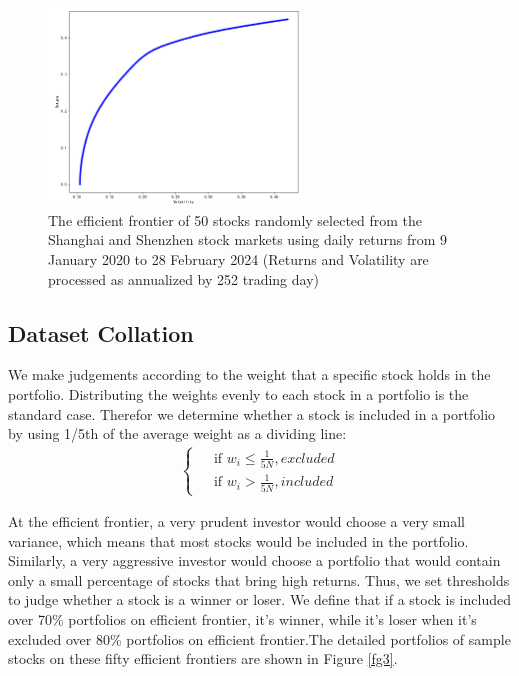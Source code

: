 \documentclass[default,iicol]{sn-jnl}%
\begin{document}
\begin{figure}[h]
	\centering    
	\includegraphics[width = 0.6\textwidth]{figures/Fig 2.png}
	\caption{The efficient frontier of 50 stocks randomly selected from the Shanghai and Shenzhen stock markets using daily returns from 9 January 2020 to 28 February 2024 (Returns and Volatility are processed as annualized by 252 trading day)}
	\label{fg2}
\end{figure} 

\subsection{Dataset Collation}\label{sec4sub3}
\hspace{1.5em}We make judgements according to the weight that a specific stock holds in the portfolio. Distributing the weights evenly to each stock in a portfolio is the standard case. Therefor we determine whether a stock is included in a portfolio by using 1/5th of the average weight as a dividing line:
\begin{align}
	\begin{cases}
		& \text{ if } w_{i}\le \frac{1}{5N} ,excluded \\
		& \text{ if } w_{i}> \frac{1}{5N} ,included
	\end{cases}
\label{eq7}
\end{align}

At the efficient frontier, a very prudent investor would choose a very small variance, which means that most stocks would be included in the portfolio. Similarly, a very aggressive investor would choose a portfolio that would contain only a small percentage of stocks that bring high returns. Thus, we set thresholds to judge whether a stock is a winner or loser. We define that if a stock is included over 70\% portfolios on efficient frontier, it's winner, while it's loser when it's excluded over 80\% portfolios on efficient frontier.The detailed portfolios of sample stocks on these fifty efficient frontiers are shown in Figure \ref{fg3}.
\end{document}

